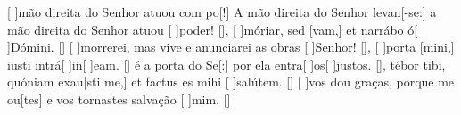 {    {[ ]{mão} direita do Senhor atuou com po[!] A mão direita do Senhor levan[-se:] a mão direita do Senhor atuou [ ]{po}{der}! [\LinkPT]},
  {[ ]{mó}riar, sed [vam,] et narrábo ó[ ]{Dó}mini. [\LinkLA]}%
    {[ ]{mor}rerei, mas vive e anunciarei as obras [ ]{Se}{\-nhor}! [\LinkPT]},
  {[ ]{por}ta [mini,] iusti intrá[ ]{in}[ ]{e}am. [\LinkLA]}%
    { é a porta do Se[:] por ela entra[ ]{os}[ ]{jus}tos. [\LinkPT]},
  {tébor tibi, quóniam exau[sti me,] et factus es mihi [ ]{sa}{lú}tem. [\LinkLA]}%
    {[ ]{vos} dou graças, porque me ou[tes] e vos tornastes salvação [ ]{mim}. [\LinkPT]}
}